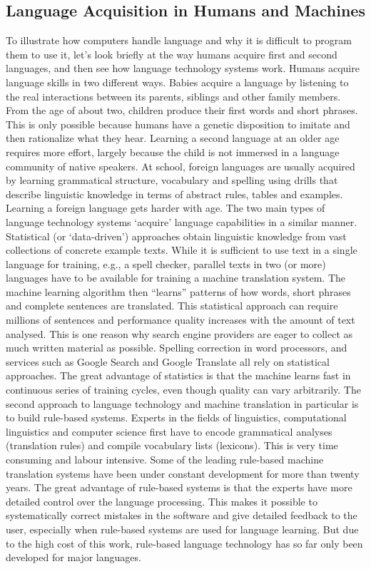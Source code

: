 \documentclass[]{../metanetpaper}
\begin{document}
	\subsection{Language Acquisition in Humans and Machines}
To illustrate how computers handle language and why it is difficult to program them to use it, let’s look briefly at the way humans acquire first and second languages, and then see how language technology systems work. 
Humans acquire language skills in two different ways. Babies acquire a language by listening to the real interactions between its parents, siblings and other family members. From the age of about two, children produce their first words and short phrases. This is only possible because humans have a genetic disposition to imitate and then rationalize what they hear. 
Learning a second language at an older age requires more effort, largely because the child is not immersed in a language community of native speakers. At school, foreign languages are usually acquired by learning grammatical structure, vocabulary and spelling using drills that describe linguistic knowledge in terms of abstract rules, tables and examples. Learning a foreign language gets harder with age.
The two main types of language technology systems ‘acquire’ language capabilities in a similar manner. Statistical (or ‘data-driven’) approaches obtain linguistic knowledge from vast collections of concrete example texts. While it is sufficient to use text in a single language for training, e.g., a spell checker, parallel texts in two (or more) languages have to be available for training a machine translation system. The machine learning algorithm then “learns” patterns of how words, short phrases and complete sentences are translated. 
This statistical approach can require millions of sentences and performance quality increases with the amount of text analysed. This is one reason why search engine providers are eager to collect as much written material as possible. Spelling correction in word processors, and services such as Google Search and Google Translate all rely on statistical approaches. The great advantage of statistics is that the machine learns fast in continuous series of training cycles, even though quality can vary arbitrarily.
The second approach to language technology and machine translation in particular is to build rule-based systems. Experts in the fields of linguistics, computational linguistics and computer science first have to encode grammatical analyses (translation rules) and compile vocabulary lists (lexicons). This is very time consuming and labour intensive. Some of the leading rule-based machine translation systems have been under constant development for more than twenty years. The great advantage of rule-based systems is that the experts have more detailed control over the language processing. This makes it possible to systematically correct mistakes in the software and give detailed feedback to the user, especially when rule-based systems are used for language learning. But due to the high cost of this work, rule-based language technology has so far only been developed for major languages. 
\end{document}
